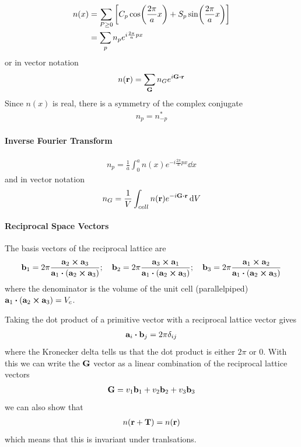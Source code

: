 \documentclass[../main.tex]{subfiles}
\begin{document}
\begin{align*}
    n(x) &= \sum_{P \geq 0} \qt[C_p \cos(\frac{2\pi}{a}x) + S_p \sin(\frac{2\pi}{a}x)] \\
    &= \sum_{p} n_p e^{i\frac{2\pi}{a}px}
\end{align*}
or in vector notation
\begin{align*}
    n(\vb{r}) = \sum_{\vb{G}} n_G e^{i\vb{G} \vdot \vb{r}}
\end{align*}
Since $n(x)$ is real, there is a symmetry of the complex conjugate
\begin{align*}
    n_p = n_{-p}^*
\end{align*}

\paragraph{Inverse Fourier Transform}
\begin{align*}
    n_p = \frac{1}{a} \int_0^a n(x) e^{-i\frac{2\pi}{a}px} \dd{x}
\end{align*}
and in vector notation
\begin{align*}
    n_G = \frac{1}{V} \int_{cell} n(\vb{r}) e^{-i\vb{G} \vdot \vb{r}} \dd{V}
\end{align*}

\paragraph{Reciprocal Space Vectors}

The basis vectors of the reciprocal lattice are
\begin{align*}
    \vb{b}_1 = 2\pi \frac{\vb{a}_2 \cross \vb{a}_3}{\vb{a}_1 \vdot (\vb{a}_2 \cross \vb{a}_3)};
    \quad \vb{b}_2 = 2\pi \frac{\vb{a}_3 \cross \vb{a}_1}{\vb{a}_1 \vdot (\vb{a}_2 \cross \vb{a}_3)};
    \quad \vb{b}_3 = 2\pi \frac{\vb{a}_1 \cross \vb{a}_2}{\vb{a}_1 \vdot (\vb{a}_2 \cross \vb{a}_3)}
\end{align*}
where the denominator is the volume of the unit cell (parallelpiped)
$\vb{a}_1 \vdot (\vb{a}_2 \cross \vb{a}_3) = V_c$.

Taking the dot product of a primitive vector with a reciprocal lattice vector gives
\begin{align*}
    \vb{a}_i \vdot \vb{b}_j = 2\pi \delta_{ij}
\end{align*}
where the Kronecker delta tells us that the dot product is either $2\pi$ or $0$. With this we can
write the $\vb{G}$ vector as a linear combination of the reciprocal lattice vectors
\begin{align*}
    \vb{G} = v_1\vb{b}_1 + v_2\vb{b}_2 + v_3\vb{b}_3
\end{align*}
we can also show that
\begin{align*}
    n(\vb{r} + \vb{T}) = n(\vb{r})
\end{align*}
which means that this is invariant under tranlsations.
\end{document}
